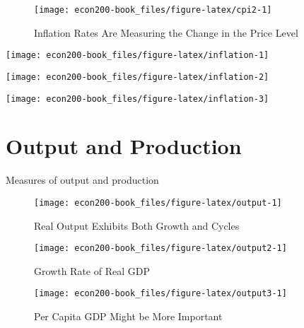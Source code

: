 \documentclass[
]{book}
\begin{document}
\begin{figure}

{\centering \texttt{[image: econ200-book\_files/figure-latex/cpi2-1]} 

}

\caption{Inflation Rates Are Measuring the Change in the Price Level}\label{fig:cpi2}
\end{figure}

\begin{center}\texttt{[image: econ200-book\_files/figure-latex/inflation-1]} \end{center}

\begin{center}\texttt{[image: econ200-book\_files/figure-latex/inflation-2]} \end{center}

\begin{center}\texttt{[image: econ200-book\_files/figure-latex/inflation-3]} \end{center}

\hypertarget{production}{%
\chapter{Output and Production}\label{production}}

Measures of output and production

\begin{figure}

{\centering \texttt{[image: econ200-book\_files/figure-latex/output-1]} 

}

\caption{Real Output Exhibits Both Growth and Cycles}\label{fig:output}
\end{figure}

\begin{figure}

{\centering \texttt{[image: econ200-book\_files/figure-latex/output2-1]} 

}

\caption{Growth Rate of Real GDP}\label{fig:output2}
\end{figure}

\begin{figure}

{\centering \texttt{[image: econ200-book\_files/figure-latex/output3-1]} 

}

\caption{Per Capita GDP Might be More Important}\label{fig:output3}
\end{figure}
\end{document}
